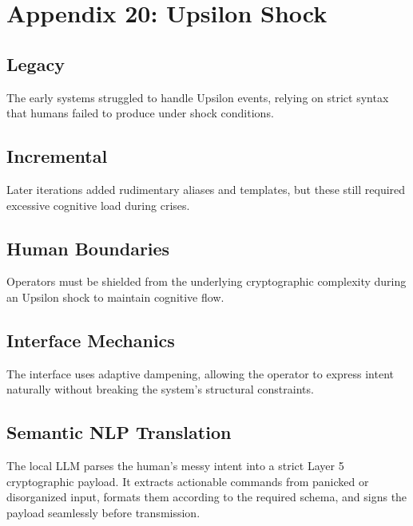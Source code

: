 \chapter{Appendix 20: Upsilon Shock}

\section{Legacy}
The early systems struggled to handle Upsilon events, relying on strict syntax that humans failed to produce under shock conditions. 

\section{Incremental}
Later iterations added rudimentary aliases and templates, but these still required excessive cognitive load during crises.

\section{Human Boundaries}
Operators must be shielded from the underlying cryptographic complexity during an Upsilon shock to maintain cognitive flow.

\section{Interface Mechanics}
The interface uses adaptive dampening, allowing the operator to express intent naturally without breaking the system's structural constraints.

\section{Semantic NLP Translation}
The local LLM parses the human's messy intent into a strict Layer 5 cryptographic payload. It extracts actionable commands from panicked or disorganized input, formats them according to the required schema, and signs the payload seamlessly before transmission.
